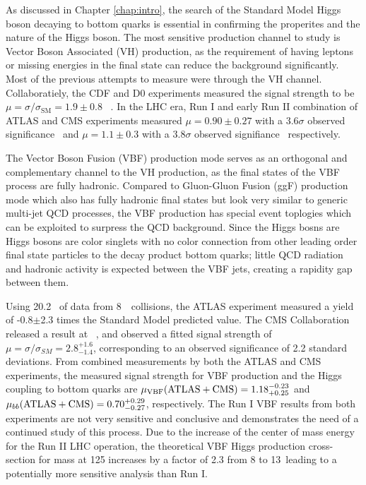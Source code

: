 As discussed in Chapter \ref{chap:intro}, the search of the Standard Model Higgs boson decaying to bottom quarks is essential in confirming the properites and the nature of the Higgs boson. The most sensitive production channel to study \Hbb is Vector Boson Associated (VH) production, as the requirement of having leptons or missing energies in the final state can reduce the background significantly. Most of the previous attempts to measure \Hbb were through the VH channel. Collaboratiely, the CDF and D0 experiments measured the \Hbb signal strength to be $\mu=\sigma/\sigma_\text{SM}=1.9 \pm 0.8$ ~\cite{Aaltonen:2012qt}. In the LHC era, Run I and early Run II combination of ATLAS and CMS experiments measured $\mu=0.90 \pm 0.27$ with a $3.6\sigma$ observed significance~\cite{HIGG-2016-29} and $\mu=1.1 \pm 0.3$ with a $3.8\sigma$ observed signifiance~\cite{CMS-HIG-16-044} respectively.

The Vector Boson Fusion (VBF) production mode serves as an orthogonal and complementary channel to the VH production, as the final states of the VBF \Hbb process are fully hadronic. Compared to Gluon-Gluon Fusion (ggF) production mode which also has fully hadronic final states but look very similar to generic multi-jet QCD processes, the VBF production has special event toplogies which can be exploited to surpress the QCD background. Since the Higgs bosns are Higgs bosons are color singlets with no color connection from other leading order final state particles to the decay product bottom quarks; little QCD radiation and hadronic activity is expected between the VBF jets, creating a rapidity gap between them. 

Using 20.2 \ifb~of data from 8~\tev~collisions, the ATLAS experiment measured a yield of -0.8$\pm$2.3 times the Standard Model predicted value\cite{HIGG-2014-12}. The CMS Collaboration released a result\cite{CMS-HIG-14-004} at ~\tev, and observed a fitted signal strength of $\mu = \sigma/\sigma_{SM} = 2.8^{+1.6}_{-1.4}$, corresponding to an observed significance of 2.2 standard deviations.   From combined measurements by both the ATLAS and CMS experiments\cite{HIGG-2015-07}, the measured signal strength for VBF production and the Higgs coupling to bottom quarks are $\mu_{\rm VBF}({\rm ATLAS+CMS})  = 1.18_{+0.25}^{-0.23}$ and $\mu_{bb} ({\rm ATLAS+CMS}) = 0.70^{+0.29}_{-0.27}$, respectively. The Run I VBF \Hbb results from both experiments are not very sensitive and conclusive and demonstrates the need of a continued study of this process. Due to the increase of the center of mass energy for the Run II LHC operation, the theoretical VBF Higgs production cross-section for mass at 125 \GeV increases by a factor of 2.3 from 8 to 13~\tev leading to a potentially more sensitive analysis than Run I. 

